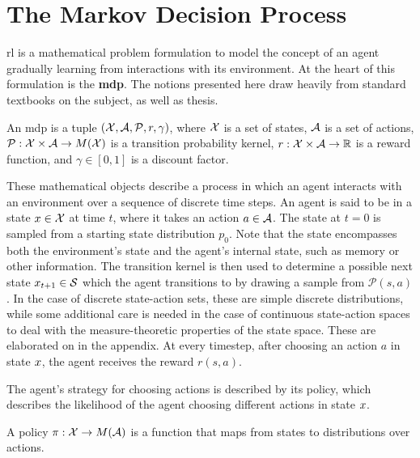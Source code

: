 \section{The Markov Decision Process}
\label{chap:background:mdp}

\ac{rl} is a mathematical problem formulation to model the concept of an agent gradually learning from interactions with its environment.
At the heart of this formulation is the \textbf{\ac{mdp}}.
The notions presented here draw heavily from standard textbooks on the subject, as well as thesis.

\begin{definition}
An {\ac{mdp}} is a tuple $(\mathcal{X},\mathcal{A},\mathcal{P},r,\gamma)$, where $\mathcal{X}$ is a set of states, $\mathcal{A}$ is a set of actions, $\mathcal{P}: \mathcal{X} \times \mathcal{A} \rightarrow M(\mathcal{X})$ is a transition probability kernel, $r: \mathcal{X} \times \mathcal{A} \rightarrow \mathbb{R}$ is a reward function, and $\gamma \in [0,1]$ is a discount factor.
\end{definition}

These mathematical objects describe a process in which an agent interacts with an environment over a sequence of discrete time steps.
An agent is said to be in a state $x \in \mathcal{X}$ at time $t$, where it takes an action $a \in \mathcal{A}$.
The state at $t=0$ is sampled from a starting state distribution $p_0$.
Note that the state encompasses both the environment's state and the agent's internal state, such as memory or other information.
The transition kernel is then used to determine a possible next state $x_{t+1} \in \mathcal{S}$ which the agent transitions to by drawing a sample from $\mathcal{P}(s,a)$.
In the case of discrete state-action sets, these are simple discrete distributions, while some additional care is needed in the case of continuous state-action spaces to deal with the measure-theoretic properties of the state space.
These are elaborated on in the appendix.
At every timestep, after choosing an action $a$ in state $x$, the agent receives the reward $r(s,a)$.

The agent's strategy for choosing actions is described by its policy, which describes the likelihood of the agent choosing different actions in state $x$.

\begin{definition}[Policy]
    A policy $\pi: \mathcal{X} \rightarrow M(\mathcal{A})$ is a function that maps from states to distributions over actions.
\end{definition}


